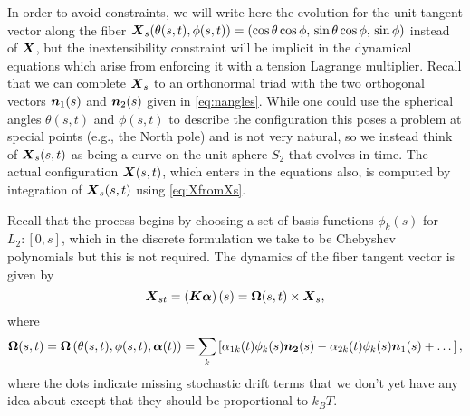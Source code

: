 In order to avoid constraints, we will write here the evolution for the unit tangent vector along the fiber $\boldsymbol{X}_s(\theta(s,t),\phi(s,t)) = \left( \cos{\theta} \cos{\phi},\, \sin{\theta} \cos{\phi},\,  \sin{\phi} \right)$ instead of $\boldsymbol{X}$, but the inextensibility constraint will be implicit in the dynamical equations which arise from enforcing it with a tension Lagrange multiplier. Recall that we can complete $\boldsymbol{X}_s$ to an orthonormal triad with the two orthogonal vectors $\boldsymbol{n}_1(s)$ and $\boldsymbol{n}_2(s)$ given in \eqref{eq:nangles}. While one could use the spherical angles $\theta(s,t)$ and $\phi(s,t)$ to describe the configuration this poses a problem at special points (e.g., the North pole) and is not very natural, so we instead think of $\boldsymbol{X}_s(s,t)$ as being a curve on the unit sphere $S_2$ that evolves in time. The actual configuration $\boldsymbol{X}(s,t)$, which enters in the equations also, is computed by integration of $\boldsymbol{X}_s(s,t)$ using \eqref{eq:XfromXs}.

Recall that the process begins by choosing a set of basis functions $\phi_k(s)$ for $L_2:[0,s]$, which in the discrete formulation we take to be Chebyshev polynomials but this is not required. The dynamics of the fiber tangent vector is given by
\begin{equation}
\label{eq:Xsupdate_fluct}
\boldsymbol{X}_{st} = \left( \boldsymbol{K} \boldsymbol{\alpha}\right)(s) = \boldsymbol{\Omega}(s,t) \times \boldsymbol{X}_s, 
\end{equation}
where
\begin{equation}
\label{eq:Omega_fluct}
\boldsymbol{\Omega}(s,t) = \boldsymbol{\Omega}\left(\theta(s,t),\phi(s,t), \boldsymbol{\alpha}(t)\right) = 
	\sum_k \left[ \alpha_{1k}(t) \phi_k(s) \boldsymbol{n_2}(s) - \alpha_{2k}(t) \phi_k(s) \boldsymbol{n}_1(s) + \dots \right],
\end{equation}
where the dots indicate missing stochastic drift terms that we don't yet have any idea about except that they should be proportional to $k_B T$.

